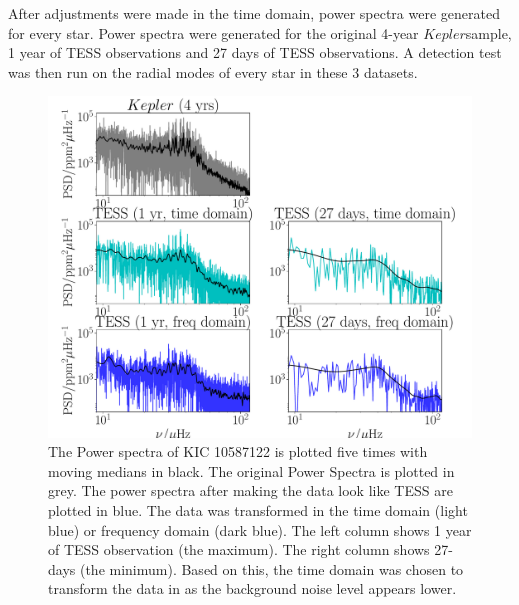 \documentclass[a4paper,fleqn,usenatbib,useAMS]{mnras}
\newcommand{\kep}{\ensuremath{Kepler}\:}
\begin{document}
After adjustments were made in the time domain, power spectra were generated for every star. Power spectra were generated for the original 4-year \kep sample, 1 year of TESS observations and 27 days of TESS observations. A detection test was then run on the radial modes of every star in these 3 datasets. 

\begin{figure}
	\centering
	\includegraphics[scale=0.3]{diagnostic_plot1_modes}
	\caption{The Power spectra of KIC 10587122 is plotted five times with moving medians in black. The original Power Spectra is plotted in grey. The power spectra after making the data look like TESS are plotted in blue. The data was transformed in the time domain (light blue) or frequency domain (dark blue). The left column shows 1 year of TESS observation (the maximum). The right column shows 27-days (the minimum). Based on this, the time domain was chosen to transform the data in as the background noise level appears lower.}	
	\label{Power Spectra}
\end{figure} 
\end{document}
